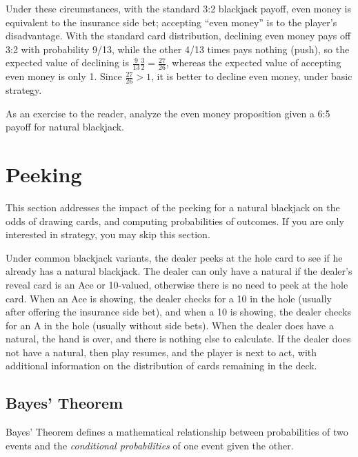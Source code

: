 Under these circumstances, with the standard 3:2 blackjack payoff, 
even money is equivalent to the insurance side bet;
accepting ``even money'' is to the player's disadvantage.
With the standard card distribution, 
declining even money pays off 3:2 with probability 9/13, 
while the other 4/13 times pays nothing (push), 
so the expected value of declining is
$\frac{9}{13}\frac{3}{2}=\frac{27}{26}$,
whereas the expected value of accepting even money is only 1.  
Since $\frac{27}{26}>1$, it is better to decline even money, 
under basic strategy.

As an exercise to the reader, analyze the even money proposition
given a 6:5 payoff for natural blackjack.

\section{Peeking}
\label{sec:basic:peeking}

This section addresses the impact of the peeking for a natural blackjack
on the odds of drawing cards, and computing probabilities of outcomes.
If you are only interested in strategy, you may skip this section.  

Under common blackjack variants, the dealer peeks at the hole card
to see if he already has a natural blackjack.
The dealer can only have a natural if the dealer's reveal card is an 
Ace or 10-valued, otherwise there is no need to peek at the hole card.
When an Ace is showing, the dealer checks for a 10 in the hole (usually 
after offering the insurance side bet), and when a 10 is showing, 
the dealer checks for an A in the hole (usually without side bets).
When the dealer does have a natural, the hand is over, 
and there is nothing else to calculate.
If the dealer does not have a natural, then play resumes, 
and the player is next to act, with additional information on the
distribution of cards remaining in the deck.

\subsection{Bayes' Theorem}
\label{sec:basic:peeking:bayes}

Bayes' Theorem defines a mathematical relationship between
probabilities of two events and the \emph{conditional probabilities}
of one event given the other.

